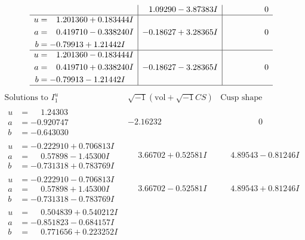 \documentclass[1p]{elsarticle_modified}
\theoremstyle{definition}
\newcommand{\I}{\sqrt{-1}}
\begin{document}
$$\begin{array}{c|c|c}
 & \phantom{-}1.09290 - 3.87383 I & \phantom{-0.000000 } 0 \\ \hline\begin{aligned}
u &= \phantom{-}1.201360 + 0.183444 I \\
a &= \phantom{-}0.419710 - 0.338240 I \\
b &= -0.79913 + 1.21442 I\end{aligned}
 & -0.18627 + 3.28365 I & \phantom{-0.000000 } 0 \\ \hline\begin{aligned}
u &= \phantom{-}1.201360 - 0.183444 I \\
a &= \phantom{-}0.419710 + 0.338240 I \\
b &= -0.79913 - 1.21442 I\end{aligned}
 & -0.18627 - 3.28365 I & \phantom{-0.000000 } 0\\
 \hline 
 \end{array}$$\newpage$$\begin{array}{c|c|c}  
\text{Solutions to }I^u_{1}& \I (\text{vol} + \sqrt{-1}CS) & \text{Cusp shape}\\
 \hline 
\begin{aligned}
u &= \phantom{-}1.24303\phantom{ +0.000000I} \\
a &= -0.920747\phantom{ +0.000000I} \\
b &= -0.643030\phantom{ +0.000000I}\end{aligned}
 & -2.16232\phantom{ +0.000000I} & \phantom{-0.000000 } 0 \\ \hline\begin{aligned}
u &= -0.222910 + 0.706813 I \\
a &= \phantom{-}0.57898 - 1.45300 I \\
b &= -0.731318 + 0.783769 I\end{aligned}
 & \phantom{-}3.66702 + 0.52581 I & \phantom{-}4.89543 - 0.81246 I \\ \hline\begin{aligned}
u &= -0.222910 - 0.706813 I \\
a &= \phantom{-}0.57898 + 1.45300 I \\
b &= -0.731318 - 0.783769 I\end{aligned}
 & \phantom{-}3.66702 - 0.52581 I & \phantom{-}4.89543 + 0.81246 I \\ \hline\begin{aligned}
u &= \phantom{-}0.504839 + 0.540212 I \\
a &= -0.851823 - 0.684157 I \\
b &= \phantom{-}0.771656 + 0.223252 I\end{aligned}

\end{array}$$
\end{document}
